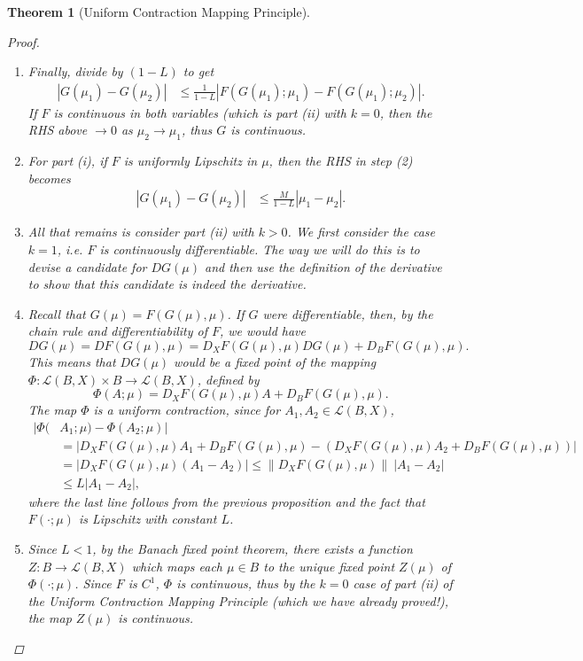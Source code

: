 \documentclass[12pt]{amsart}         %
\newtheorem{theorem}{Theorem}[section]
\theoremstyle{remark}
\begin{document}
\begin{theorem}[Uniform Contraction Mapping Principle]
\begin{proof}
\begin{enumerate}
\item Finally, divide by $(1 - L)$ to get 
\begin{align*}\label{Gmudiff}
|G(\mu_1) - G(\mu_2)| &\leq \frac{1}{1-L}|F( G(\mu_1); \mu_1) - F(G(\mu_1); \mu_2)|.
\end{align*}
If $F$ is continuous in both variables (which is part (ii) with $k = 0$, then the RHS above $\rightarrow 0$ as $\mu_2 \rightarrow \mu_1$, thus $G$ is continuous.

\item For part (i), if $F$ is uniformly Lipschitz in $\mu$, then the RHS in step (2) becomes 
\begin{align*}
|G(\mu_1) - G(\mu_2)| &\leq \frac{M}{1-L} |\mu_1 - \mu_2|.
\end{align*}

\item All that remains is consider part (ii) with $k > 0$. We first consider the case $k = 1$, i.e. $F$ is continuously differentiable. The way we will do this is to devise a candidate for $DG(\mu)$ and then use the definition of the derivative to show that this candidate is indeed the derivative.

\item Recall that $G(\mu) = F(G(\mu),\mu)$. If $G$ were differentiable, then, by the chain rule and differentiability of $F$, we would have
\[
DG(\mu) = DF(G(\mu),\mu) = D_X F(G(\mu), \mu)DG(\mu) + D_B F(G(\mu), \mu).
\]
This means that $DG(\mu)$ would be a fixed point of the mapping $\Phi: \mathcal{L}(B, X) \times B \rightarrow \mathcal{L}(B, X)$, defined by
\[
\Phi(A; \mu) = D_X F(G(\mu), \mu) A + D_B F(G(\mu), \mu).
\]
The map $\Phi$ is a uniform contraction, since for $A_1, A_2 \in \mathcal{L}(B, X)$,
\begin{align*}
|\Phi(&A_1; \mu) - \Phi(A_2; \mu)| \\
&= | D_X F(G(\mu), \mu) A_1 + D_B F(G(\mu), \mu) - (D_X F(G(\mu), \mu) A_2 + D_B F(G(\mu), \mu)) | \\
&= | D_X F(G(\mu), \mu) (A_1 - A_2) | 
\leq \|D_X F(G(\mu), \mu) \|\:|A_1 - A_2| \\
&\leq L |A_1 - A_2|,
\end{align*}
where the last line follows from the previous proposition and the fact that $F(\cdot; \mu)$ is Lipschitz with constant $L$.

\item Since $L < 1$, by the Banach fixed point theorem, there exists a function $Z: B \rightarrow \mathcal{L}(B, X)$ which maps each $\mu \in B$ to the unique fixed point $Z(\mu)$ of $\Phi(\cdot; \mu)$. Since $F$ is $C^1$, $\Phi$ is continuous, thus by the $k = 0$ case of part (ii) of the Uniform Contraction Mapping Principle (which we have already proved!), the map $Z(\mu)$ is continuous.
    

\end{enumerate}
\end{proof}
\end{theorem}
\end{document}

